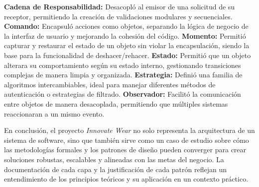 \textbf{Cadena de Responsabilidad:} Desacopló al emisor de una solicitud de su receptor, permitiendo la creación de validaciones modulares y secuenciales.
\textbf{Comando:} Encapsuló acciones como objetos, separando la lógica de negocio de la interfaz de usuario y mejorando la cohesión del código.
\textbf{Momento:} Permitió capturar y restaurar el estado de un objeto sin violar la encapsulación, siendo la base para la funcionalidad de deshacer/rehacer.
\textbf{Estado:} Permitió que un objeto alterara su comportamiento según su estado interno, gestionando transiciones complejas de manera limpia y organizada.
\textbf{Estrategia:} Definió una familia de algoritmos intercambiables, ideal para manejar diferentes métodos de autenticación o estrategias de filtrado.
\textbf{Observador:} Facilitó la comunicación entre objetos de manera desacoplada, permitiendo que múltiples sistemas reaccionaran a un mismo evento.

\noindent En conclusión, el proyecto \textit{Innovate Wear} no solo representa la arquitectura de un sistema de software, sino que también sirve como un caso de estudio sobre cómo las metodologías formales y los patrones de diseño pueden converger para crear soluciones robustas, escalables y alineadas con las metas del negocio. La documentación de cada capa y la justificación de cada patrón reflejan un entendimiento de los principios teóricos y su aplicación en un contexto práctico.